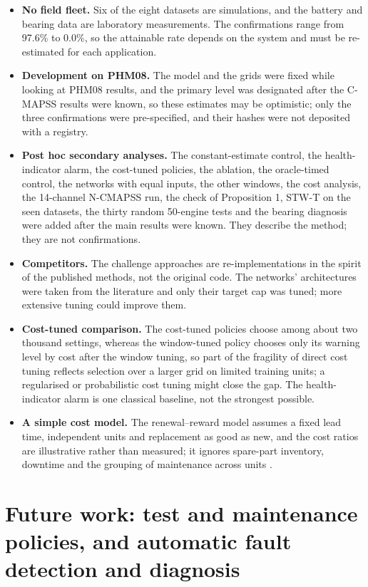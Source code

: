 \documentclass[a4paper,fleqn,doubleblind]{cas-dc}
\begin{document}
\begin{itemize}[leftmargin=1.2em,itemsep=2pt]
\item \textbf{No field fleet.} Six of the eight datasets are simulations, and the battery and bearing data are laboratory measurements. The confirmations range from 97.6\% to 0.0\%, so the attainable rate depends on the system and must be re-estimated for each application.
\item \textbf{Development on PHM08.} The model and the grids were fixed while looking at PHM08 results, and the primary level was designated after the C-MAPSS results were known, so these estimates may be optimistic; only the three confirmations were pre-specified, and their hashes were not deposited with a registry.
\item \textbf{Post hoc secondary analyses.} The constant-estimate control, the health-indicator alarm, the cost-tuned policies, the ablation, the oracle-timed control, the networks with equal inputs, the other windows, the cost analysis, the 14-channel N-CMAPSS run, the check of Proposition 1, STW-T on the seen datasets, the thirty random 50-engine tests and the bearing diagnosis were added after the main results were known. They describe the method; they are not confirmations.
\item \textbf{Competitors.} The challenge approaches are re-implementations in the spirit of the published methods, not the original code. The networks' architectures were taken from the literature and only their target cap was tuned; more extensive tuning could improve them.
\item \textbf{Cost-tuned comparison.} The cost-tuned policies choose among about two thousand settings, whereas the window-tuned policy chooses only its warning level by cost after the window tuning, so part of the fragility of direct cost tuning reflects selection over a larger grid on limited training units; a regularised or probabilistic cost tuning \cite{kamariotis2024} might close the gap. The health-indicator alarm is one classical baseline, not the strongest possible.
\item \textbf{A simple cost model.} The renewal--reward model assumes a fixed lead time, independent units and replacement as good as new, and the cost ratios are illustrative rather than measured; it ignores spare-part inventory, downtime and the grouping of maintenance across units \cite{depater2022,mitici2023}.
\end{itemize}

\section{Future work: test and maintenance policies, and automatic fault detection and diagnosis}\label{sec:8}
\end{document}
